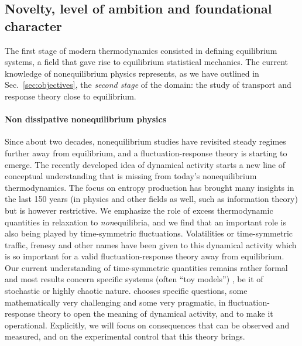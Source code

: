 \subsection{Novelty, level of ambition and foundational character}\label{sec:progress}


The first stage of modern thermodynamics consisted in defining equilibrium systems, a field
that gave rise to equilibrium statistical mechanics. The current knowledge of nonequilibrium
physics represents, as we have outlined in Sec.~\ref{sec:objectives}, the {\em second stage}
of the domain: the study of transport and response theory close to
equilibrium.

\paragraph{Non dissipative nonequilibrium physics}
Since about two decades, nonequilibrium studies have revisited steady regimes further away
from equilibrium, and a fluctuation-response theory is starting to emerge.
The recently developed idea of dynamical activity starts a new line of conceptual
understanding that is missing from today's nonequilibrium thermodynamics. The focus on
entropy production has brought many insights in the last 150 years (in physics and other
fields as well, such as information theory) but is however restrictive.  We emphasize the role of excess thermodynamic quantities in relaxation to {\it non}equilibria, and we find that an important role is also being played by time-symmetric fluctuations.
Volatilities or time-symmetric traffic, frenesy and other names have been given to this dynamical activity which is so important  for a valid fluctuation-response theory away from equilibrium.
 Our current
understanding of time-symmetric quantities remains rather formal and most results concern
specific systems (often ``toy models'') , be it of stochastic or highly chaotic nature.
%
\TheProject chooses specific questions, some mathematically very challenging and some very
pragmatic, in fluctuation-response theory to open the meaning of dynamical activity, and to
make it operational.
%
Explicitly, we will focus on consequences that can be observed and measured, and on the
experimental control that this theory brings.

